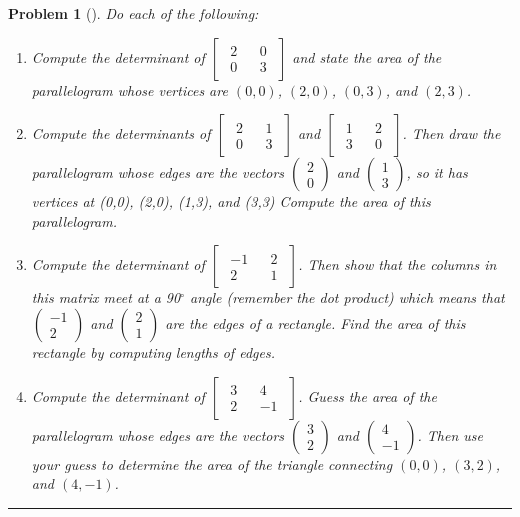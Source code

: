 \documentclass[letterpaper,oneside]{book}%
\theoremstyle{plain}
\theoremstyle{box}
\theoremstyle{problem}
\newtheorem{problemnum}{Problem}[chapter]
\newenvironment{problem}[1][]{\begin{problemnum}[#1]}{\end{problemnum}\nopagebreak\hrule\bigskip}
\newcommand{\pvec}[1]{\begin{pmatrix} #1 \end{pmatrix}}
\newcommand{\nvec}[1]{\begin{matrix} #1 \end{matrix}}
\begin{document}
\begin{problem}Do each of the following:
\begin{enumerate}
\item Compute the determinant of 
$
\begin{bmatrix}
 \nvec{2\\0}&\nvec{0\\3}
\end{bmatrix}
$ 
and state the area of the parallelogram whose vertices are $(0,0)$, $(2,0)$, $(0,3)$, and $(2,3)$. 
 \item Compute the determinants of
$
\begin{bmatrix}
 \nvec{2\\0}&\nvec{1\\3}
\end{bmatrix}
$ 
and
$
\begin{bmatrix}
 \nvec{1\\3}&\nvec{2\\0}
\end{bmatrix}
$.  
Then draw the parallelogram whose edges are the vectors $\pvec{2\\0}$ and $\pvec{1\\3}$, so it has vertices at (0,0), (2,0), (1,3), and (3,3) Compute the area of this parallelogram. 
 \item Compute the determinant of
$
\begin{bmatrix}
 \nvec{-1\\2}&\nvec{2\\1}
\end{bmatrix}
$. 
Then show that the columns in this matrix meet at a 90$^\circ$ angle (remember the dot product) which means that $\pvec{-1\\2}$ and $\pvec{2\\1}$  are the edges of a rectangle. Find the area of this rectangle by computing lengths of edges. 
 \item Compute the determinant of 
$
\begin{bmatrix}
 \nvec{3\\2}&\nvec{4\\-1}
\end{bmatrix}
$.
Guess the area of the parallelogram whose edges are the vectors $\pvec{3\\2}$ and $\pvec{4\\-1}$. Then use your guess to determine the area of the triangle connecting $(0,0)$, $(3,2)$, and $(4,-1)$.
\end{enumerate}


\end{problem}
\end{document}
